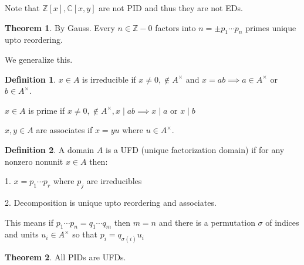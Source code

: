 \documentclass{article}
\theoremstyle{definition}
\newtheorem{definition}{Definition}
\newtheorem{theorem}{Theorem}
\begin{document}
Note that \(\mathbb{Z}[x],\mathbb{C}[x,y]\) are not PID and thus they are not EDs.

\begin{theorem}
    By Gauss. Every \(n\in\mathbb{Z} -0\) factors into \(n=\pm p_1\cdots p_n\) primes unique upto reordering.
\end{theorem}

We generalize this.

\begin{definition}
    \(x\in A\) is irreducible if \(x\neq 0,\notin A^\times \) and \(x=ab\implies a\in A^\times \) or \(b\in A^\times\).
    
    \(x\in A\) is prime if \(x\neq 0,\notin A^\times ,x\mid ab\implies x\mid a\) or \(x\mid b\)
    
    \(x,y\in A\) are associates if \(x=yu\) where \(u\in A^\times \).   
\end{definition}

\begin{definition}
    A domain \(A\) is a UFD (unique factorization domain) if for any nonzero nonunit \(x\in A\) then:

    1. \(x=p_1\cdots p_r\) where \(p_j\) are irreducibles

    2. Decomposition is unique upto reordering and associates.
    
    This means if \(p_1\cdots p_n=q_1\cdots q_m\) then \(m=n\) and there is a permutation \(\sigma \) of indices and units \(u_i\in A^\times \) so that \(p_i=q_{\sigma(i)}u_i\)  
\end{definition}

\begin{theorem}
    All PIDs are UFDs.
\end{theorem}
\end{document}
